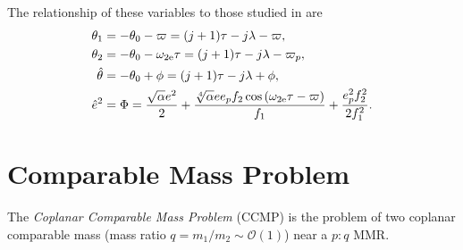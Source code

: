 \documentclass[usenatbib,twocolumn]{mnras}
\begin{document}
The relationship of these variables to those studied in \citet{laune22_apsid_align_anti_align_planet} are
\begin{align}
    \theta_1 &= -\theta_0 - \varpi = (j+1)\tau-j\lambda-\varpi ,\\
    \theta_2 &= -\theta_0 - \omega_{\rm 2e}\tau = (j+1)\tau-j\lambda-\varpi_p, \\
    \hat\theta &= -\theta_0 + \phi = (j+1)\tau-j\lambda+\phi,\\
    \hat e^2 &= \Phi = \frac{\sqrt{\alpha} e^{2}}{2} + \frac{\sqrt[4]{\alpha} e e_{p} f_{2} \cos{\left(\omega_{2\rm e} \tau - \varpi \right)}}{f_{1}}  + \frac{e_{p}^{2} f_{2}^{2}}{2 f_{1}^{2}}.
\end{align}


\clearpage
\section{Comparable Mass Problem}
The \emph{Coplanar Comparable Mass Problem} (CCMP) is the problem of two coplanar comparable mass (mass ratio $q=m_1/m_2\sim\mathcal O(1)$) near a $p:q$ MMR.
\end{document}
